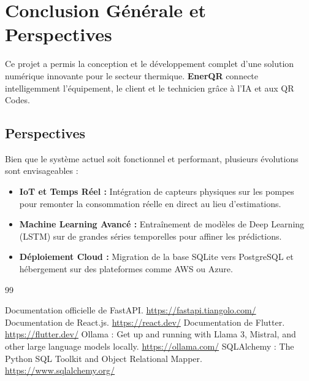 \documentclass[12pt, a4paper, twoside]{report}
\begin{document}
\chapter{Conclusion Générale et Perspectives}
Ce projet a permis la conception et le développement complet d'une solution numérique innovante pour le secteur thermique. \textbf{EnerQR} connecte intelligemment l'équipement, le client et le technicien grâce à l'IA et aux QR Codes.

\section*{Perspectives}
Bien que le système actuel soit fonctionnel et performant, plusieurs évolutions sont envisageables :
\begin{itemize}
    \item \textbf{IoT et Temps Réel :} Intégration de capteurs physiques sur les pompes pour remonter la consommation réelle en direct au lieu d'estimations.
    \item \textbf{Machine Learning Avancé :} Entraînement de modèles de Deep Learning (LSTM) sur de grandes séries temporelles pour affiner les prédictions.
    \item \textbf{Déploiement Cloud :} Migration de la base SQLite vers PostgreSQL et hébergement sur des plateformes comme AWS ou Azure.
\end{itemize}

\begin{thebibliography}{99}
 Documentation officielle de FastAPI. \url{https://fastapi.tiangolo.com/}
 Documentation de React.js. \url{https://react.dev/}
 Documentation de Flutter. \url{https://flutter.dev/}
 Ollama : Get up and running with Llama 3, Mistral, and other large language models locally. \url{https://ollama.com/}
 SQLAlchemy : The Python SQL Toolkit and Object Relational Mapper. \url{https://www.sqlalchemy.org/}
\end{thebibliography}
\end{document}
